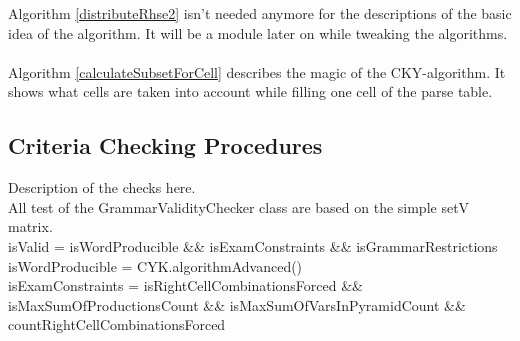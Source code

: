 \noindent
{}
Algorithm \ref{distributeRhse2} isn't needed anymore for the descriptions of the basic idea of the algorithm. It will be a module later on while tweaking the algorithms.
\\
\\
Algorithm \ref{calculateSubsetForCell} describes the magic of the CKY-algorithm. It shows what cells are taken into account while filling one cell of the parse table.

\pagebreak

\subsection{Criteria Checking Procedures}
\noindent Description of the checks here. \\
\noindent All test of the GrammarValidityChecker class are based on the simple setV matrix. \\

\noindent  isValid = isWordProducible \&\& isExamConstraints \&\& isGrammarRestrictions\\

\noindent  isWordProducible = CYK.algorithmAdvanced()\\

\noindent  isExamConstraints = isRightCellCombinationsForced \&\& isMaxSumOfProductionsCount \&\& isMaxSumOfVarsInPyramidCount \&\& countRightCellCombinationsForced \\

